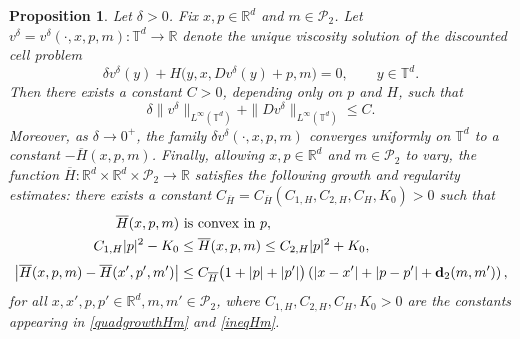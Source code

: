 \documentclass[reqno,11pt]{amsart}
\newtheorem{proposition}[theorem]{Proposition}
\numberwithin{equation}{section}
\renewcommand{\bar}{\overline}
\begin{document}
\begin{proposition}\label{effHm}
Let $\delta>0$. Fix $x, p\in \mathbb{R}^d$ and $m \in \mathcal{P}_2$. Let $v^\delta = v^\delta(\cdot,x,p,m)\colon \mathbb{T}^d \to \mathbb{R}$
denote the unique viscosity solution of the discounted cell problem
\begin{equation}\label{discountcellm}
    \delta v^\delta(y) + H\big(y,x, Dv^\delta(y) + p, m\big) = 0,
    \qquad y \in \mathbb{T}^d.
\end{equation}
Then there exists a constant $C>0$, depending only on $p$ and $H$, such that
\[
\delta\| v^\delta\|_{L^\infty(\mathbb{T}^d)} + \|Dv^\delta\|_{L^\infty(\mathbb{T}^d)} \le C.
\]
Moreover, as $\delta \to 0^+$, the family $\delta v^\delta(\cdot,x,p,m)$ converges uniformly on $\mathbb{T}^d$ to a constant $-\overline{H}(x,p,m)$. Finally, allowing $x, p \in \mathbb{R}^d$ and $m\in \mathcal{P}_2$ to vary, the function $\overline{H}\colon \mathbb{R}^d\times\mathbb{R}^d \times \mathcal{P}_2 \to \mathbb{R}$ satisfies the following growth and regularity estimates: there exists a constant $C_{\overline{H}}=C_{\overline{H}}(C_{1,H},C_{2,H}, C_H, K_0) > 0$ such that
\begin{align}
\bar{H}(x,p,m) &\text{ is convex in }p,\\
    C_{1,H} |p|^2 -K_0
    &\le \overline{H}(x,p,m)
    \le C_{2,H} |p|^2 + K_0, \label{eqn:Hbarmgrowth}\\[1mm]
    \big|\overline{H}(x, p,m) - \overline{H}(x', p',m')\big|
    &\le C_{\overline{H}}\big(1 + |p| + |p'|\big)\left(|x-x'|+|p - p'|+{\bf d}_2(m,m')\right),\label{eqn:Hbarmreg}
\end{align}
for all $x,x',p,p' \in \mathbb{R}^d, m, m' \in \mathcal{P}_2$, where $C_{1,H}, C_{2, H}, C_H, K_0>0$ are the constants appearing in
\eqref{quadgrowthHm} and \eqref{ineqHm}.
\end{proposition}
\end{document}
